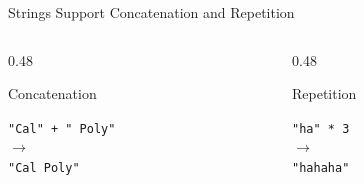 \documentclass[aspectratio=169,10pt]{beamer}
\begin{document}
\begin{frame}{Strings Support Concatenation and Repetition}

  \begin{columns}[T,onlytextwidth]

    \begin{column}{0.48\textwidth}

      \begin{block}{Concatenation}

        \centering
        \texttt{"Cal" + " Poly"}\\[0.08in]
        $\rightarrow$\\[0.08in]
        \texttt{"Cal Poly"}

      \end{block}

    \end{column}

    \begin{column}{0.48\textwidth}

      \begin{block}{Repetition}

        \centering
        \texttt{"ha" * 3}\\[0.08in]
        $\rightarrow$\\[0.08in]
        \texttt{"hahaha"}

      \end{block}

    \end{column}

  \end{columns}

  \vspace{0.08in}

\end{frame}
\end{document}
